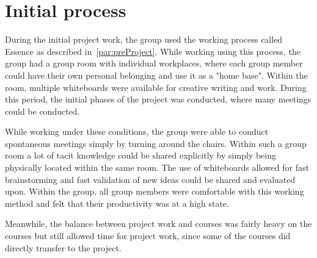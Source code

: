 \section{Initial process}
During the initial project work, the group used the working process called Essence as described in~\autoref{par:preProject}.
While working using this process, the group had a group room with individual workplaces, where each group member could have their own personal belonging and use it as a "home base".
Within the room, multiple whiteboards were available for creative writing and work.
During this period, the initial phases of the project was conducted, where many meetings could be conducted.

While working under these conditions, the group were able to conduct spontaneous meetings simply by turning around the chairs.
Within such a group room a lot of tacit knowledge could be shared explicitly by simply being physically located within the same room.
The use of whiteboards allowed for fast brainstorming and fast validation of new ideas could be shared and evaluated upon.
Within the group, all group members were comfortable with this working method and felt that their productivity was at a high state. 

Meanwhile, the balance between project work and courses was fairly heavy on the courses but still allowed time for project work, since some of the courses did directly transfer to the project.
